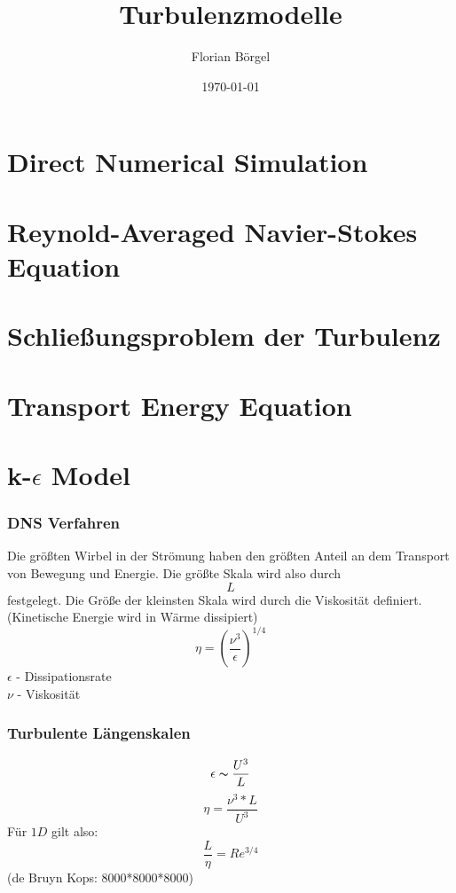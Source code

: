 \documentclass[12pt,t]{beamer}
\title[Theoretische Ozeanographie]{Turbulenzmodelle}
\author[Florian Börgel]{Florian Börgel}
\date{\today}
\institute{Universität Oldenburg}
\begin{document}
\frame{\titlepage}

\section{Direct Numerical Simulation}
\section{Reynold-Averaged Navier-Stokes Equation}
\section{Schließungsproblem der Turbulenz}
\section{Transport Energy Equation}
\section{k-$\epsilon$ Model}
\begin{frame}
	\frametitle{DNS Verfahren}
Die größten Wirbel in der Strömung haben den größten Anteil an dem Transport von Bewegung und Energie. Die größte Skala wird also durch 
\begin{equation}
L
\end{equation}
festgelegt. Die Größe der kleinsten Skala wird durch die Viskosität definiert. (Kinetische Energie wird in Wärme dissipiert)
\begin{equation}
\eta = (\frac{\nu^3}{\epsilon})^{1/4}
\end{equation}
\hspace{1cm}$\epsilon$ - Dissipationsrate\\
\hspace{1cm}$\nu$ - Viskosität
\end{frame}


\begin{frame}
	\frametitle{Turbulente Längenskalen}
\begin{equation}
\epsilon\thicksim \frac{U^3}{L}
\end{equation}
\begin{equation}
\eta = \frac{\nu^3 * L}{U^3}
\end{equation}
Für $1D$ gilt also:
\begin{equation}
\frac{L}{\eta} = Re^{3/4} 
\end{equation}
(de Bruyn Kops: 8000*8000*8000)
\end{frame}
\end{document}
